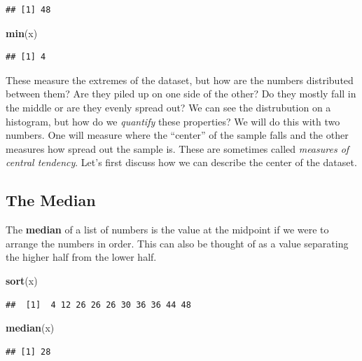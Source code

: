 \documentclass[]{book}
\newenvironment{Shaded}{\begin{snugshade}}{\end{snugshade}}
\newcommand{\KeywordTok}[1]{\textcolor[rgb]{0.13,0.29,0.53}{\textbf{#1}}}
\newcommand{\NormalTok}[1]{#1}
\begin{document}
\begin{verbatim}
## [1] 48
\end{verbatim}

\begin{Shaded}
\begin{Highlighting}[]
\KeywordTok{min}\NormalTok{(x)}
\end{Highlighting}
\end{Shaded}

\begin{verbatim}
## [1] 4
\end{verbatim}

These measure the extremes of the dataset, but how are the numbers distributed between them? Are they piled up on one side of the other? Do they mostly fall in the middle or are they evenly spread out? We can see the distrubution on a histogram, but how do we \emph{quantify} these properties? We will do this with two numbers. One will measure where the ``center'' of the sample falls and the other measures how spread out the sample is. These are sometimes called \emph{measures of central tendency}. Let's first discuss how we can describe the center of the dataset.

\hypertarget{the-median}{%
\subsection{The Median}\label{the-median}}

The \textbf{median} of a list of numbers is the value at the midpoint if we were to arrange the numbers in order. This can also be thought of as a value separating the higher half from the lower half.

\begin{Shaded}
\begin{Highlighting}[]
\KeywordTok{sort}\NormalTok{(x)}
\end{Highlighting}
\end{Shaded}

\begin{verbatim}
##  [1]  4 12 26 26 26 30 36 36 44 48
\end{verbatim}

\begin{Shaded}
\begin{Highlighting}[]
\KeywordTok{median}\NormalTok{(x)}
\end{Highlighting}
\end{Shaded}

\begin{verbatim}
## [1] 28
\end{verbatim}
\end{document}
